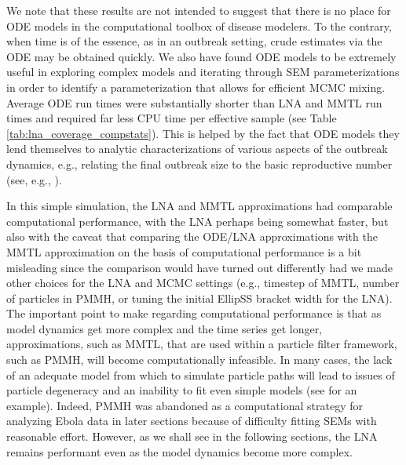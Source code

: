 We note that these results are not intended to suggest that there is no place for ODE models in the computational toolbox of disease modelers. To the contrary,  when time is of the essence, as in an outbreak setting, crude estimates via the ODE may be obtained quickly. We also have found ODE models to be extremely useful in exploring complex models and iterating through SEM parameterizations in order to identify a parameterization that allows for efficient MCMC mixing. Average ODE run times were substantially shorter than LNA and MMTL run times and required far less CPU time per effective sample (see Table \ref{tab:lna_coverage_compstats}). This is helped by the fact that ODE models they lend themselves to analytic characterizations of various aspects of the outbreak dynamics, e.g., relating the final outbreak size to the basic reproductive number (see, e.g., \cite{andersson2000stochastic,britton2018,keeling2008}).

In this simple simulation, the LNA and MMTL approximations had comparable computational performance, with the LNA perhaps being somewhat faster, but also with the caveat that comparing the ODE/LNA approximations with the MMTL approximation on the basis of computational performance is a bit misleading since the comparison would have turned out differently had we made other choices for the LNA and MCMC settings (e.g., timestep of MMTL, number of particles in PMMH, or tuning the initial EllipSS bracket width for the LNA). The important point to make regarding computational performance is that as model dynamics get more complex and the time series get longer, approximations, such as MMTL, that are used within a particle filter framework, such as PMMH, will become computationally infeasible. In many cases, the lack of an adequate model from which to simulate particle paths will lead to issues of particle degeneracy and an inability to fit even simple models (see \cite{fintzi2017efficient} for an example). Indeed, PMMH was abandoned as a computational strategy for analyzing Ebola data in later sections because of difficulty fitting SEMs with reasonable effort. However, as we shall see in the following sections, the LNA remains performant even as the model dynamics become more complex. 
 
